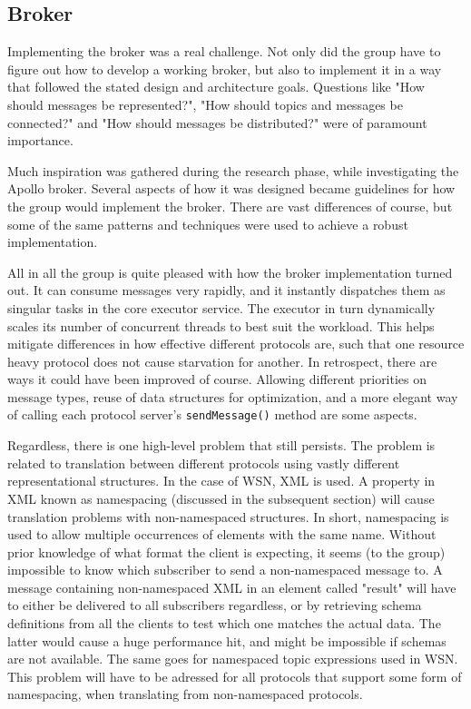 \subsection{Broker}
\label{subsec:Implementation_broker}
Implementing the broker was a real challenge. Not only did the group have to figure out how to develop a working broker, but also to implement it in a way that followed the stated design and architecture goals. Questions like "How should messages be represented?", "How should topics and messages be connected?" and "How should messages be distributed?" were of paramount importance.

Much inspiration was gathered during the research phase, while investigating the Apollo broker. Several aspects of how it was designed became guidelines for how the group would implement the broker. There are vast differences of course, but some of the same patterns and techniques were used to achieve a robust implementation.

All in all the group is quite pleased with how the broker implementation turned out. It can consume messages very rapidly, and it instantly dispatches them as singular tasks in the core executor service. The executor in turn dynamically scales its number of concurrent threads to best suit the workload. This helps mitigate differences in how effective different protocols are, such that one resource heavy protocol does not cause starvation for another. In retrospect, there are ways it could have been improved of course. Allowing different priorities on message types, reuse of data structures for optimization, and a more elegant way of calling each protocol server's \verb!sendMessage()! method are some aspects.

Regardless, there is one high-level problem that still persists. The problem is related to translation between different protocols using vastly different representational structures. In the case of WSN, XML is used. A property in XML known as namespacing (discussed in the subsequent section) will cause translation problems with non-namespaced structures. In short, namespacing is used to allow multiple occurrences of elements with the same name. Without prior knowledge of what format the client is expecting, it seems (to the group) impossible to know which subscriber to send a non-namespaced message to. A message containing non-namespaced XML in an element called "result" will have to either be delivered to all subscribers regardless, or by retrieving schema definitions from all the clients to test which one matches the actual data. The latter would cause a huge performance hit, and might be impossible if schemas are not available. The same goes for namespaced topic expressions used in WSN. This problem will have to be adressed for all protocols that support some form of namespacing, when translating from non-namespaced protocols.

